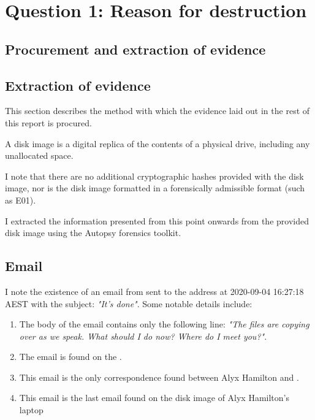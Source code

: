 \section{Question 1: Reason for destruction} %
\label{sec:question_reason_for_destruction}
\subsection{Procurement and extraction of evidence} %
\label{sub:procurement_and_extraction_of_evidence}

\subsection{Extraction of evidence} %
\label{sub:extraction_of_evidence}

\begin{myenum}
    \item This section describes the method with which the evidence laid out in the rest of this report is procured.
    \item A disk image is a digital replica of the contents of a physical drive, including any unallocated space.
    \item I note that there are no additional cryptographic hashes provided with the disk image, nor is the disk image formatted in a forensically admissible format (such as E01).
    \item I extracted the information presented from this point onwards from the provided disk image using the Autopsy forensics toolkit.
\end{myenum}


\subsection{Email} %
\label{sub:email}

\begin{myenum}
\item \label{item:email} I note the existence of an email from  sent to the address  at 2020-09-04 16:27:18 AEST with the subject: \emph{"It's done"}. Some notable details include:
    \begin{enumerate}
        \item The body of the email contains only the following line: \emph{"The files are copying over as we speak. What should I do now? Where do I meet you?"}.
        \item The email is found on the .
        \item This email is the only correspondence found between Alyx Hamilton and .
        \item This email is the last email found on the disk image of Alyx Hamilton's laptop
    \end{enumerate}
\end{myenum}

